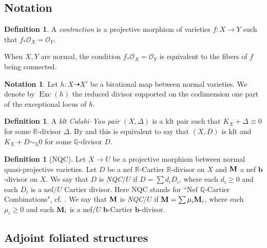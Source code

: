 \documentclass[12pt]{amsart}
\numberwithin{equation}{section}
\newcommand{\bb}{\bm{b}}
\newcommand{\Mm}{{\bf{M}}}
\newcommand{\Rr}{\mathbb{R}}
\newcommand{\Exc}{\operatorname{Exc}}
\theoremstyle{definition}
\newtheorem{defn}[thm]{Definition}
\theoremstyle{definition}
\newtheorem{nota}[thm]{Notation}
\theoremstyle{definition}
\begin{document}
\subsection{Notation}

\begin{defn}
    A \emph{contraction} is a projective morphism of varieties
    $f \colon X \to Y$
    such that 
    $f_\ast \mathcal{O}_X=\mathcal{O}_Y$.
\end{defn}

When $X, Y$ are normal, the condition 
$f_\ast \mathcal{O}_X=\mathcal{O}_Y$
is equivalent to the fibers of $f$ being connected.

\begin{nota}
    Let $h \colon  X\dashrightarrow X'$ be a birational map between normal varieties. We denote by $\Exc(h)$ the reduced divisor supported on the codimension one part of the exceptional locus of $h$. 
\end{nota}

\begin{defn}\label{defn: klt cy type}
A \emph{klt Calabi--Yau pair} $(X,\Delta)$ is a klt pair such that $K_X+\Delta\equiv 0$ for some $\Rr$-divisor $\Delta$. By \cite[Theorem 0.1]{Amb05} and \cite[Lemma 5.3]{HLS24} this is equivalent to say that $(X,D)$ is klt and $K_X+D\sim_{\mathbb Q}0$ for some $\mathbb Q$-divisor $D$.
\end{defn}

\begin{defn}[NQC]
    Let $X\rightarrow U$ be a projective morphism between normal quasi-projective varieties. Let $D$ be a nef $\Rr$-Cartier $\Rr$-divisor on $X$ and $\Mm$ a nef $\bb$-divisor on $X$. 
        We say that $D$ is \emph{NQC}$/U$ if $D=\sum d_iD_i$, where each $d_i\geq 0$ and each $D_i$ is a nef$/U$ Cartier divisor. Here NQC stands for ``Nef $\mathbb Q$-Cartier Combinations", cf. \cite[Definition 2.15]{HL22}. We say that $\Mm$ is \emph{NQC}$/U$ if $\Mm=\sum \mu_i\Mm_i$, where each $\mu_i\geq 0$ and each $\Mm_i$ is a nef$/U$ $\bb$-Cartier $\bb$-divisor.
\end{defn}


\subsection{Adjoint foliated structures}
\end{document}
